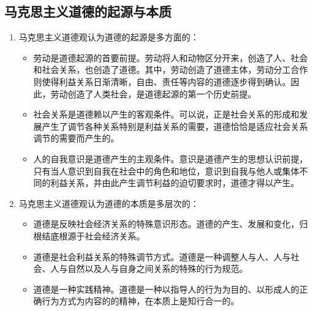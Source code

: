 \subsection{马克思主义道德的起源与本质}
\begin{enumerate}
\item 马克思主义道德观认为道德的起源是多方面的：
\begin{itemize}
\item 劳动是道德起源的首要前提。劳动将人和动物区分开来，创造了人、社会和社会关系，也创造了道德。其中，劳动创造了道德主体，劳动分工合作则使得利益关系日渐清晰，自由、责任等内容的道德逐步得到确认。因此，劳动创造了人类社会，是道德起源的第一个历史前提。
\item 社会关系是道德赖以产生的客观条件。可以说，正是社会关系的形成和发展产生了调节各种关系特别是利益关系的需要，道德恰恰是适应社会关系调节的需要而产生的。
\item 人的自我意识是道德产生的主观条件。意识是道德产生的思想认识前提，只有当人意识到自我在社会中的角色和地位，意识到自我与他人或集体不同的利益关系，并由此产生调节利益的迫切要求时，道德才得以产生。
\end{itemize}
\item 马克思主义道德观认为道德的本质是多层次的：
\begin{itemize}
\item 道德是反映社会经济关系的特殊意识形态。道德的产生、发展和变化，归根结底根源于社会经济关系。
\item 道德是社会利益关系的特殊调节方式。道德是一种调整人与人、人与社会、人与自然以及人与自身之间关系的特殊的行为规范。
\item 道德是一种实践精神。道德是一种以指导人的行为为目的、以形成人的正确行为方式为内容的的精神，在本质上是知行合一的。
\end{itemize}
\end{enumerate}

